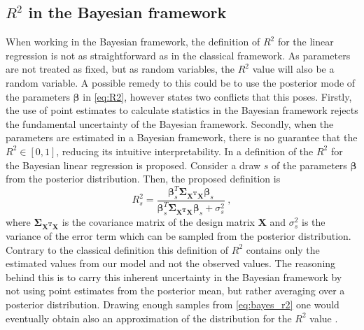 \subsection{\texorpdfstring{$R^2$}{Lg} in the Bayesian framework}
\label{sec:bayes_R2}
When working in the Bayesian framework, the definition of $R^2$ for the linear regression is not as straightforward as in the classical framework. As parameters are not treated as fixed, but as random variables, the $R^2$ value will also be a random variable. A possible remedy to this could be to use the posterior mode of the parameters $\boldsymbol{\beta}$ in \eqref{eq:R2}, however \citet{gelman2017rsquared} states two conflicts that this poses. Firstly, the use of point estimates to calculate statistics in the Bayesian framework rejects the fundamental uncertainty of the Bayesian framework. Secondly, when the parameters are estimated in a Bayesian framework, there is no guarantee that the $R^2 \in [0, 1]$, reducing its intuitive interpretability. 
In \citet{gelman2017rsquared} a definition of the $R^2$ for the Bayesian linear regression is proposed. Consider a draw $s$ of the parameters $\boldsymbol{\beta}$ from the posterior distribution. Then, the proposed definition is
\begin{equation}
    \label{eq:bayes_r2}
    R_s^2 = \frac{\boldsymbol{\beta}_s^T \boldsymbol{\Sigma_{\mathbf{X^TX}}}\boldsymbol{\beta}_s}{\boldsymbol{\beta}_s^T \boldsymbol{\Sigma_{\mathbf{X^TX}}}\boldsymbol{\beta}_s + \sigma^2_s} \ ,
\end{equation}
where $\boldsymbol{\Sigma_{\mathbf{X^TX}}}$ is the covariance matrix of the design matrix $\mathbf{X}$ and $\sigma^2_s$ is the variance of the error term which can be sampled from the posterior distribution.
Contrary to the classical definition this definition of $R^2$ contains only the estimated values from our model and not the observed values. The reasoning behind this is to carry this inherent uncertainty in the Bayesian framework by not using point estimates from the posterior mean, but rather averaging over a posterior distribution. %
Drawing enough samples from \eqref{eq:bayes_r2} one would eventually obtain also an approximation of the distribution for the $R^2$ value \citep{gelman2017rsquared}.



